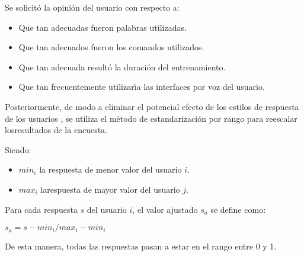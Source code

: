 Se solicit\'o la opini\'on del usuario con respecto a:
\begin{itemize}
	\item Que tan adecuadas fueron palabras utilizadas.
	\item Que tan adecuados fueron los comandos utilizados.
	\item Que tan adecuada result\'o la duraci\'on del entrenamiento.
	\item Que tan frecuentemente utilizar{\'\i}a las interfaces por voz del usuario.
\end{itemize}

Posteriormente, de modo a eliminar el potencial efecto de los estilos de respuesta
de los usuarios \cite{Fischer2010}, se utiliza el m\'etodo de estandarizaci\'on 
por rango \cite{Pagolu2011} para reescalar losresultados de la encuesta.

Siendo:
\begin{itemize}
	\item $min_i$ la respuesta de menor valor del usuario $i$.
	\item $max_i$ larespuesta de mayor valor del usuario $j$.
\end{itemize}

Para cada respuesta $s$ del usuario $i$, el valor ajustado $s_a$ se define como:

$s_a={s-min_i}/{max_i-min_i}$ 

De esta manera, todas las respuestas pasan a estar en el rango entre 0 y 1.  




